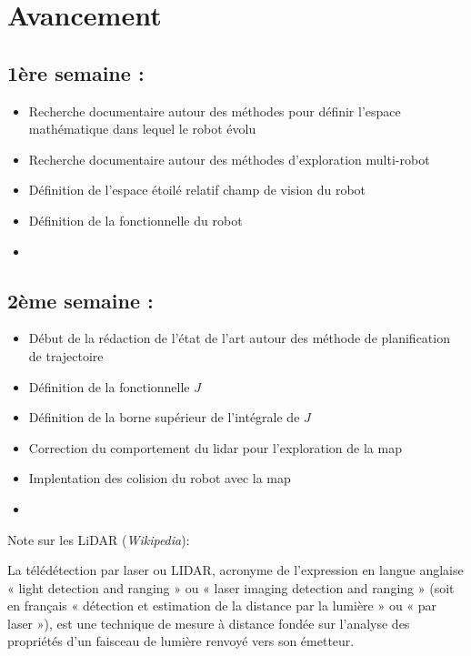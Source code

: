 \documentclass[main.tex]{subfiles}
\begin{document}
\section{Avancement}

\subsection{1ère semaine :}

\begin{itemize}
    \item Recherche documentaire autour des méthodes pour définir l'espace mathématique dans lequel le robot évolu
    \item Recherche documentaire autour des méthodes d'exploration multi-robot
    \item Définition de l'espace étoilé relatif champ de vision du robot
    \item Définition de la fonctionnelle du robot
    \item 
\end{itemize}


\subsection{2ème semaine :}

\begin{itemize}
    \item Début de la rédaction de l'état de l'art autour des méthode de planification de trajectoire
    \item Définition de la fonctionnelle $J$
    \item Définition de la borne supérieur de l'intégrale de $J$
    \item Correction du comportement du lidar pour l'exploration de la map
    \item Implentation des colision du robot avec la map
    \item 
\end{itemize}


Note sur les LiDAR (\textit{Wikipedia}): 

La télédétection par laser ou LIDAR, acronyme de l'expression en langue anglaise « light detection and ranging » ou « laser imaging detection and ranging » (soit en français « détection et estimation de la distance par la lumière » ou « par laser »), est une technique de mesure à distance fondée sur l'analyse des propriétés d'un faisceau de lumière renvoyé vers son émetteur.
\end{document}

